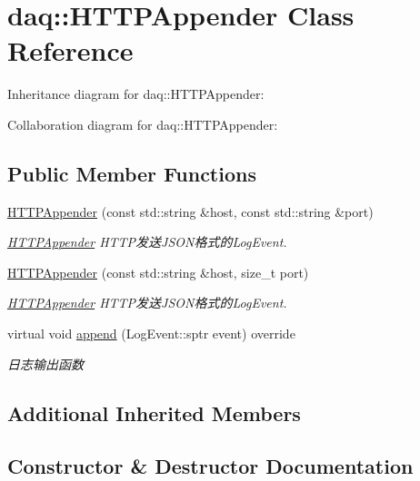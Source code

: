 \hypertarget{classdaq_1_1HTTPAppender}{}\section{daq\+:\+:H\+T\+T\+P\+Appender Class Reference}
\label{classdaq_1_1HTTPAppender}


Inheritance diagram for daq\+:\+:H\+T\+T\+P\+Appender\+:


Collaboration diagram for daq\+:\+:H\+T\+T\+P\+Appender\+:
\subsection*{Public Member Functions}
\begin{DoxyCompactItemize}
\item 
\hyperlink{classdaq_1_1HTTPAppender_ac101f7a7fc339dbc95ffb1d35a825457}{H\+T\+T\+P\+Appender} (const std\+::string \&host, const std\+::string \&port)
\begin{DoxyCompactList}\small\item\em \hyperlink{classdaq_1_1HTTPAppender}{H\+T\+T\+P\+Appender} H\+T\+T\+P发送\+J\+S\+O\+N格式的\+Log\+Event. \end{DoxyCompactList}\item 
\hyperlink{classdaq_1_1HTTPAppender_ac2c72846193984eb6720ea20e300ab03}{H\+T\+T\+P\+Appender} (const std\+::string \&host, size\+\_\+t port)
\begin{DoxyCompactList}\small\item\em \hyperlink{classdaq_1_1HTTPAppender}{H\+T\+T\+P\+Appender} H\+T\+T\+P发送\+J\+S\+O\+N格式的\+Log\+Event. \end{DoxyCompactList}\item 
virtual void \hyperlink{classdaq_1_1HTTPAppender_a0d4525deaa491bbc44a7b463bc931967}{append} (Log\+Event\+::sptr event) override
\begin{DoxyCompactList}\small\item\em 日志输出函数 \end{DoxyCompactList}\end{DoxyCompactItemize}
\subsection*{Additional Inherited Members}


\subsection{Constructor \& Destructor Documentation}
\mbox{\label{classdaq_1_1HTTPAppender_ac101f7a7fc339dbc95ffb1d35a825457}} 
